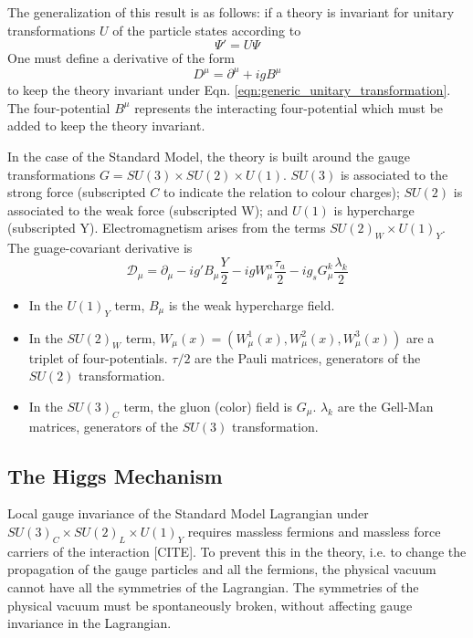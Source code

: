 \documentclass{article}
\begin{document}
The generalization of this result is as follows: if a theory is invariant for unitary transformations $U$ of the particle states according to 
\begin{equation}
    \Psi' = U\Psi
\label{eqn:generic_unitary_transformation}
\end{equation}
One must define a derivative of the form
\begin{equation}
    D^\mu = \partial^\mu + ig B^\mu
\end{equation}
to keep the theory invariant under Eqn. \ref{eqn:generic_unitary_transformation}. The four-potential $B^\mu$ represents the interacting four-potential which must be added to keep the theory invariant.

In the case of the Standard Model, the theory is built around the gauge transformations $G = SU(3) \times SU(2) \times U(1)$. $SU(3)$ is associated to the strong force (subscripted $C$ to indicate the relation to colour charges); $SU(2)$ is associated to the weak force (subscripted W); and $U(1)$ is hypercharge (subscripted Y). Electromagnetism arises from the terms $SU(2)_W \times U(1)_Y$. The guage-covariant derivative  is 
\begin{equation}
    \mathcal{D}_\mu = \partial_\mu - ig' B_\mu \frac{Y}{2} - ig W_{\mu}^{\alpha} \frac{\tau_a}{2} - ig_s G_\mu^{k} \frac{\lambda_k}{2}
\end{equation}
\begin{itemize}
    \item In the $U(1)_Y$ term, $B_\mu$ is the weak hypercharge field.
    \item In the $SU(2)_W$ term, $W_\mu(x) = (W_\mu^1(x), W_\mu^2(x), W_\mu^3(x))$ are a triplet of four-potentials. $\tau/2$ are the Pauli matrices, generators of the $SU(2)$ transformation.
    \item In the $SU(3)_C$ term, the gluon (color) field is $G_\mu$. $\lambda_k$ are the Gell-Man matrices, generators of the $SU(3)$ transformation.
\end{itemize}   

\subsection{The Higgs Mechanism}
Local gauge invariance of the Standard Model Lagrangian under $SU(3)_C \times SU(2)_L \times U(1)_Y$ requires massless fermions and massless force carriers of the interaction [CITE]. To prevent this in the theory, i.e. to change the propagation of the gauge particles and all the fermions, the physical vacuum cannot have all the symmetries of the Lagrangian. The symmetries of the physical vacuum must be spontaneously broken, without affecting gauge invariance in the Lagrangian. 
\end{document}
